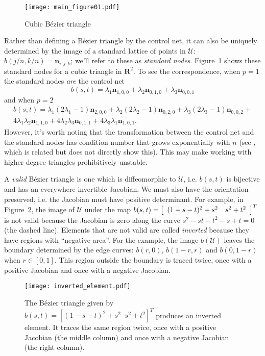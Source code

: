 \documentclass[letterpaper,10pt]{article}
\theoremstyle{definition}
\newcommand{\reals}{\mathbf{R}}
\newcommand{\utri}{\mathcal{U}}
\begin{document}
\begin{figure}
  \texttt{[image: main\_figure01.pdf]}
  \centering
  \captionsetup{width=.75\linewidth}
  \caption{Cubic B\'{e}zier triangle}
  \label{fig:cubic-bezier-example}
\end{figure}

\noindent Rather than defining a B\'{e}zier triangle by the control net, it can
also be uniquely determined by the image of a standard lattice of
points in \(\utri\): \(b\left(j/n, k/n\right) = \bm{n}_{i, j, k}\);
we'll refer to these as \emph{standard nodes}.
Figure~\ref{fig:cubic-bezier-example} shows these standard nodes for
a cubic triangle in \(\reals^2\). To see the correspondence,
when \(p = 1\) the standard nodes \emph{are} the control net
\begin{equation}
b(s, t) = \lambda_1 \bm{n}_{1, 0, 0} +
\lambda_2 \bm{n}_{0, 1, 0} + \lambda_3 \bm{n}_{0, 0, 1}
\end{equation}
and when \(p = 2\)
\begin{multline}
b(s, t) = \lambda_1\left(2 \lambda_1 - 1\right) \bm{n}_{2, 0, 0} +
\lambda_2\left(2 \lambda_2 - 1\right) \bm{n}_{0, 2, 0} +
\lambda_3\left(2 \lambda_3 - 1\right) \bm{n}_{0, 0, 2} + \\
4 \lambda_1 \lambda_2 \bm{n}_{1, 1, 0} +
4 \lambda_2 \lambda_3 \bm{n}_{0, 1, 1} +
4 \lambda_3 \lambda_1 \bm{n}_{1, 0, 1}.
\end{multline}
However, it's worth noting that the transformation between
the control net and the standard nodes has condition
number that grows exponentially with \(n\) (see \cite{Farouki1991}, which
is related but does not directly show this).
This may make working with
higher degree triangles prohibitively unstable.

A \emph{valid} B\'{e}zier triangle is one which is
diffeomorphic to \(\utri\), i.e. \(b(s, t)\) is bijective and has
an everywhere invertible Jacobian. We must also have the orientation
preserved, i.e. the Jacobian must have positive determinant. For example, in
Figure~\ref{fig:inverted-element}, the image of \(\utri\) under
the map \(b(s, t) = \left[\begin{array}{c c} (1 - s - t)^2 + s^2 & s^2 + t^2
\end{array}\right]^T\) is not valid because the Jacobian is zero along
the curve \(s^2 - st - t^2 - s + t = 0\) (the dashed line). Elements that
are not valid are called \emph{inverted} because they have regions with
``negative area''. For the example, the image \(b\left(\utri\right)\)
leaves the boundary determined by the edge curves: \(b(r, 0)\),
\(b(1 - r, r)\) and \(b(0, 1 - r)\) when \(r \in \left[0, 1\right]\).
This region outside the boundary is traced twice, once with
a positive Jacobian and once with a negative Jacobian.
\begin{figure}
  \texttt{[image: inverted\_element.pdf]}
  \centering
  \captionsetup{width=.75\linewidth}
  \caption{The B\'{e}zier triangle given by \(b(s, t) = \left[
    (1 - s - t)^2 + s^2 \; \; s^2 + t^2 \right]^T\) produces an
    inverted element. It traces the same region twice, once with
    a positive Jacobian (the middle column) and once with a negative
    Jacobian (the right column).}
  \label{fig:inverted-element}
\end{figure}
\end{document}

